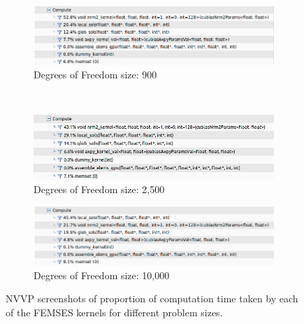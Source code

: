 \begin{figure}
	\centering
	\begin{subfigure}{0.7\linewidth}
		\centering
		\includegraphics[width = \linewidth]{Figures/femses_prop_30}
		\caption{Degrees of Freedom size: 900}
	\end{subfigure}\\
	\begin{subfigure}{0.7\linewidth}
		\centering
		\includegraphics[width=\linewidth]{Figures/femses_prop_50}
		\caption{Degrees of Freedom size: 2,500}
	\end{subfigure}
	\begin{subfigure}{0.7\linewidth}
		\centering
		\includegraphics[width=\linewidth]{Figures/femses_prop_100}
		\caption{Degrees of Freedom size: 10,000}
	\end{subfigure}
	\caption{NVVP screenshots of proportion of computation time taken by each of the FEMSES kernels for different problem sizes.}
	\label{fig:femses_comp_prop}
\end{figure}

